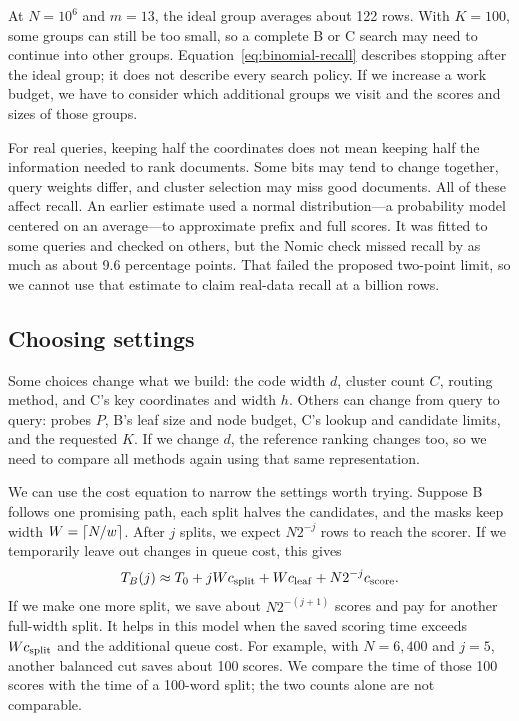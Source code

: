 
At $N=10^6$ and $m=13$, the ideal group averages about 122 rows. With $K=100$, some groups
can still be too small, so a complete B or C search may need to continue into other groups.
Equation~\ref{eq:binomial-recall} describes stopping after the ideal group; it does not describe
every search policy. If we increase a work budget, we have to consider which additional groups
we visit and the scores and sizes of those groups.

For real queries, keeping half the coordinates does not mean keeping half the information
needed to rank documents. Some bits may tend to change together, query weights differ, and
cluster selection may miss good documents. All of these affect recall. An earlier estimate
used a normal distribution---a probability model centered on an average---to approximate
prefix and full scores. It was fitted to some
queries and checked on others, but the Nomic check missed recall by as much as about 9.6
percentage points. That failed the proposed two-point limit, so we cannot use that estimate
to claim real-data recall at a billion rows.

\subsection{Choosing settings}
Some choices change what we build: the code width $d$, cluster count $C$, routing method,
and C's key coordinates and width $h$. Others can change from query to query: probes $P$,
B's leaf size and node budget, C's lookup and candidate limits, and the requested $K$. If
we change $d$, the reference ranking changes too, so we need to compare all methods again
using that same representation.

We can use the cost equation to narrow the settings worth trying. Suppose B follows one
promising path, each split halves the candidates, and the masks keep width $W=\left\lceil N/w\right\rceil$.
After $j$ splits, we expect $N2^{-j}$ rows to reach the scorer. If we temporarily leave out
changes in queue cost, this gives
\begin{equation}
T_B(j)\approx T_0+jWc_{\rm split}+Wc_{\rm leaf}+N2^{-j}c_{\rm score}.
\label{eq:depth}
\end{equation}
If we make one more split, we save about $N2^{-(j+1)}$ scores and pay for another full-width
split. It helps in this model when the saved scoring time exceeds $Wc_{\rm split}$ and the
additional queue cost. For example, with $N=6{,}400$ and $j=5$, another balanced cut saves
about 100 scores. We compare the time of those 100 scores with the time of a 100-word split;
the two counts alone are not comparable.

